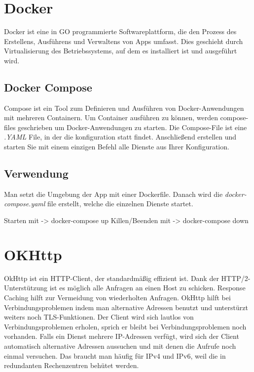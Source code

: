 \section{Docker}
\author{Bozidar Spasenovic}
Docker ist eine in GO programmierte Softwareplattform, die den Prozess des Erstellens, Ausführens und Verwaltens von Apps umfasst.
Dies geschieht durch Virtualisierung des Betriebssystems, auf dem es installiert ist und ausgeführt wird. 
\subsection{Docker Compose}
\cite{Docker-Compose}
Compose ist ein Tool zum Definieren und Ausführen von Docker-Anwendungen mit mehreren Containern. 
Um Container ausführen zu können, werden compose-files geschrieben um Docker-Anwendungen zu starten.
Die Compose-File ist eine \textit{.YAML} File, in der die konfiguration statt findet. 
Anschließend erstellen und starten Sie mit einem einzigen Befehl alle Dienste aus Ihrer Konfiguration.


\subsection{Verwendung}

Man setzt die Umgebung der App mit einer Dockerfile.
Danach wird die \textit{docker-compose.yaml} file erstellt, welche die einzelnen Dienste startet.

Starten mit -> docker-compose up \linebreak
Killen/Beenden mit -> docker-compose down




\section{OKHttp}
\cite{OkHttp}
\author{Bozidar Spasenovic}
OkHttp ist ein HTTP-Client, der standardmäßig effizient ist.
Dank der HTTP/2-Unterstützung ist es möglich alle Anfragen an einen Host zu schicken. 
Response Caching hilft zur Vermeidung von wiederholten Anfragen.
\linebreak  
OkHttp hilft bei Verbindungsproblemen indem man alternative Adressen benutzt und unterstürzt weiters noch TLS-Funktionen.
Der Client wird sich lautlos von Verbindungsproblemen erholen, sprich er bleibt bei Verbindungsproblemen noch vorhanden.
\linebreak
Falls ein Dienst mehrere IP-Adressen verfügt, wird sich der Client automatisch alternative Adressen aussuchen und mit denen
die Aufrufe noch einmal versuchen.
Das braucht man häufig für IPv4 und IPv6, weil die in redundanten Rechenzentren behütet werden. 


